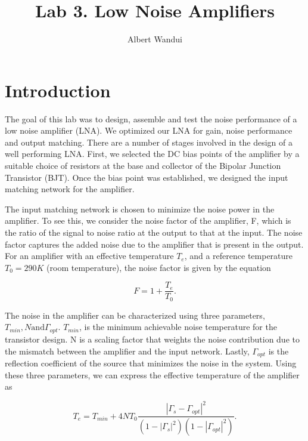 \documentclass[twocolumn, aps, apl]{revtex4-1}
\begin{document}
\title{Lab 3. Low Noise Amplifiers }
\author{Albert Wandui}
\maketitle

\section*{Introduction}\label{sec:introduction}
The goal of this lab was to design, assemble and test the noise performance of a low noise amplifier (LNA). We optimized our LNA for gain, noise performance and output matching. There are a number of stages involved in the design of a well performing LNA. First, we selected the DC bias points of the amplifier by a suitable choice of resistors at the base and collector of the Bipolar Junction Transistor (BJT). Once the bias point was established, we designed the input matching network for the amplifier.

The input matching network is chosen to minimize the noise power in the amplifier. To see this, we consider the noise factor of the amplifier, F, which is the ratio of the signal to noise ratio at the output to that at the input. The noise factor captures the added noise due to the amplifier that is present in the output. For an amplifier with an effective temperature $T_e$,  and a reference temperature $T_0 = 290 K$ (room temperature), the noise factor is given by the equation

\begin{equation}
    F = 1 + \frac{T_e}{T_0}.
\end{equation} 

The noise in the amplifier can be characterized using three parameters, $T_{min}, N \textrm{and} \Gamma_{opt}$. $T_{min}$, is the minimum achievable noise temperature for the transistor design. N is a scaling factor that weights the noise contribution due to the mismatch between the amplifier and the input network. Lastly, $\Gamma_{opt}$ is the reflection coefficient of the source that minimizes the noise in the system. Using these three parameters, we can express the effective temperature of the amplifier as 

\begin{equation}
    T_e = T_{min} + 4 N T_0 \frac{|\Gamma_s - \Gamma_{opt}|^2}{\left(1 - |\Gamma_s|^2\right)\left(1 - |\Gamma_{opt}|^2\right)}.
\end{equation}
\end{document}
